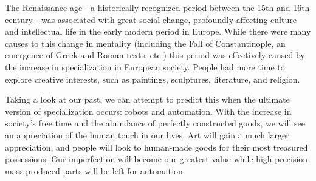 The Renaissance age - a historically recognized period between the 15th and 16th century - was associated with great social change, profoundly affecting culture and intellectual life in the early modern period in Europe. While there were many causes to this change in mentality (including the Fall of Constantinople, an emergence of Greek and Roman texts, etc.) this period was effectively caused by the increase in specialization in European society. People had more time to explore creative interests, such as paintings, sculptures, literature, and religion.

Taking a look at our past, we can attempt to predict this when the ultimate version of specialization occurs: robots and automation. With the increase in society's free time and the abundance of perfectly constructed goods, we will see an appreciation of the human touch in our lives. Art will gain a much larger appreciation, and people will look to human-made goods for their most treasured possessions. Our imperfection will become our greatest value while high-precision mass-produced parts will be left for automation.